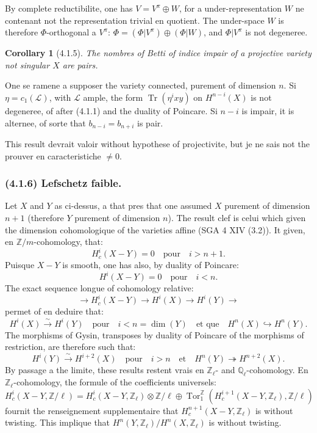 \documentclass[12pt,a4paper]{article}
\theoremstyle{plain}
\newtheorem{corollary}[theorem]{Corollary}
\theoremstyle{definition}
\theoremstyle{remark}
\DeclareMathOperator{\Tor}{Tor}
\DeclareMathOperator{\Tr}{Tr}
\newcommand{\bbZ}{\mathbb{Z}}
\newcommand{\scrL}{\mathscr{L}}
\newcommand{\Zl}{\mathbb{Z}_\ell}
\newcommand{\Ql}{\mathbb{Q}_\ell}
\begin{document}
By complete reductibilite, one has $V = V^\pi \oplus W$, for a under-representation $W$ ne contenant not the representation trivial en quotient. The under-space $W$ is therefore $\Phi$-orthogonal a $V^\pi$: $\Phi = (\Phi|V^\pi) \oplus (\Phi|W)$, and $\Phi|V^\pi$ is not degeneree.

\begin{corollary}[4.1.5]
The nombres of Betti of indice impair of a projective variety not singular $X$ are pairs.
\end{corollary}

One se ramene a supposer the variety connected, purement of dimension $n$. Si $\eta = c_1(\scrL)$, with $\scrL$ ample, the form $\Tr(\eta^i xy)$ on $H^{n-i}(X)$ is not degeneree, of after (4.1.1) and the duality of Poincare. Si $n-i$ is impair, it is alternee, of sorte that $b_{n-i} = b_{n+i}$ is pair.

This result devrait valoir without hypothese of projectivite, but je ne sais not the prouver en caracteristiche $\neq 0$.

\subsubsection*{\textup{(4.1.6)} Lefschetz faible.}

Let $X$ and $Y$ as ci-dessus, a that pres that one assumed $X$ purement of dimension $n+1$ (therefore $Y$ purement of dimension $n$). The result clef is celui which given the dimension cohomologique of the varieties affine (SGA 4 XIV (3.2)). It given, en $\bbZ/m$-cohomology, that:
\[
H^i_c(X - Y) = 0 \quad \text{pour} \quad i > n+1.
\]
Puisque $X - Y$ is smooth, one has also, by duality of Poincare:
\[
H^i(X - Y) = 0 \quad \text{pour} \quad i < n.
\]
The exact sequence longue of cohomology relative:
\[
\to H^i_c(X - Y) \to H^i(X) \to H^i(Y) \to
\]
permet of en deduire that:
\[
H^i(X) \xrightarrow{\sim} H^i(Y) \quad \text{pour} \quad i < n = \dim(Y) \quad \text{et que} \quad H^n(X) \hookrightarrow H^n(Y).
\]
The morphisms of Gysin, transposes by duality of Poincare of the morphisms of restriction, are therefore such that:
\[
H^i(Y) \xrightarrow{\sim} H^{i+2}(X) \quad \text{pour} \quad i > n \quad \text{et} \quad H^n(Y) \twoheadrightarrow H^{n+2}(X).
\]
By passage a the limite, these results restent vrais en $\Zl$- and $\Ql$-cohomology. En $\Zl$-cohomology, the formule of the coefficients universels:
\[
H^i_c(X - Y, \bbZ/\ell) = H^i_c(X - Y, \Zl) \otimes \bbZ/\ell \oplus \Tor^{\bbZ}_1(H^{i+1}_c(X - Y, \Zl), \bbZ/\ell)
\]
fournit the renseignement supplementaire that $H^{n+1}_c(X - Y, \Zl)$ is without twisting. This implique that $H^n(Y, \Zl) / H^n(X, \Zl)$ is without twisting.
\end{document}
